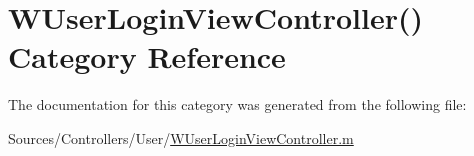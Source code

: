 \hypertarget{category_w_user_login_view_controller_07_08}{\section{W\-User\-Login\-View\-Controller() Category Reference}
\label{category_w_user_login_view_controller_07_08}
}


The documentation for this category was generated from the following file\-:\begin{DoxyCompactItemize}
\item 
Sources/\-Controllers/\-User/\hyperlink{_w_user_login_view_controller_8m}{W\-User\-Login\-View\-Controller.\-m}\end{DoxyCompactItemize}
